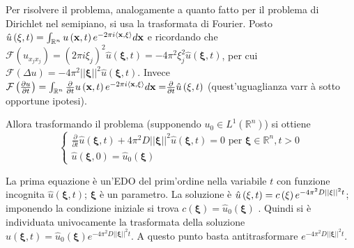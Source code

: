 \documentclass{article}
\begin{document}
Per risolvere il problema, analogamente a quanto fatto per il problema di
Dirichlet nel semipiano, si usa la trasformata di Fourier. Posto $\hat{u}%
\left( \mathbf{\xi },t\right) =\int_{%
\mathbb{R}
^{n}}u\left( \mathbf{x},t\right) e^{-2\pi i\left\langle \mathbf{x,\xi }%
\right\rangle }d\mathbf{x}$ e ricordando che $\mathcal{F}\left(
u_{x_{j}x_{j}}\right) =\left( 2\pi i\xi _{j}\right) ^{2}\hat{u}\left( 
\mathbf{\xi },t\right) =-4\pi ^{2}\xi _{j}^{2}\hat{u}\left( \mathbf{\xi }%
,t\right) $, per cui $\mathcal{F}\left( \Delta u\right) =-4\pi
^{2}\left\vert \left\vert \mathbf{\xi }\right\vert \right\vert ^{2}\hat{u}%
\left( \mathbf{\xi },t\right) $. Invece $\mathcal{F}\left( \frac{\partial u}{%
\partial t}\right) =\int_{%
\mathbb{R}
^{n}}\frac{\partial }{\partial t}u\left( \mathbf{x},t\right) e^{-2\pi
i\left\langle \mathbf{x,\xi }\right\rangle }d\mathbf{x=}\frac{\partial }{%
\partial t}\hat{u}\left( \mathbf{\xi },t\right) $ (quest'uguaglianza varr%
\`{a} sotto opportune ipotesi).

Allora trasformando il problema (supponendo $u_{0}\in L^{1}\left( 
\mathbb{R}
^{n}\right) $) si ottiene%
\begin{equation*}
\left\{ 
\begin{array}{c}
\frac{\partial }{\partial t}\hat{u}\left( \mathbf{\xi },t\right) +4\pi
^{2}D\left\vert \left\vert \mathbf{\xi }\right\vert \right\vert ^{2}\hat{u}%
\left( \mathbf{\xi },t\right) =0\text{ per }\mathbf{\xi }\in 
\mathbb{R}
^{n},t>0 \\ 
\hat{u}\left( \mathbf{\xi },0\right) =\hat{u}_{0}\left( \mathbf{\xi }\right)%
\end{array}%
\right.
\end{equation*}

La prima equazione \`{e} un'EDO del prim'ordine nella variabile $t$ con
funzione incognita $\hat{u}\left( \mathbf{\xi },t\right) $; $\mathbf{\xi }$ 
\`{e} un parametro. La soluzione \`{e} $\hat{u}\left( \mathbf{\xi },t\right)
=c\left( \mathbf{\xi }\right) e^{-4\pi ^{2}D\left\vert \left\vert \mathbf{%
\xi }\right\vert \right\vert ^{2}t}$; imponendo la condizione iniziale si
trova $c\left( \mathbf{\xi }\right) =\hat{u}_{0}\left( \mathbf{\xi }\right) $%
. Quindi si \`{e} individuata univocamente la trasformata della soluzione $%
\hat{u}\left( \mathbf{\xi },t\right) =\hat{u}_{0}\left( \mathbf{\xi }\right)
e^{-4\pi ^{2}D\left\vert \left\vert \mathbf{\xi }\right\vert \right\vert
^{2}t}$. A questo punto basta antitrasformare $e^{-4\pi ^{2}D\left\vert
\left\vert \mathbf{\xi }\right\vert \right\vert ^{2}t}$.
\end{document}
